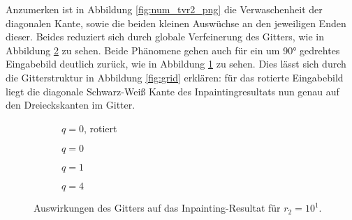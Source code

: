 \documentclass{mythesis}
\begin{document}


Anzumerken ist in Abbildung \ref{fig:num_tvr2_png} die Verwaschenheit der diagonalen Kante, sowie die beiden kleinen Auswüchse an den jeweiligen Enden dieser.
Beides reduziert sich durch globale Verfeinerung des Gitters, wie in Abbildung \ref{fig:num_tvrefine_png} zu sehen.
Beide Phänomene gehen auch für ein um 90° gedrehtes Eingabebild deutlich zurück, wie in Abbildung \ref{fig:num_tvgrid} zu sehen.
Dies lässt sich durch die Gitterstruktur in Abbildung \ref{fig:grid} erklären: für das rotierte Eingabebild liegt die diagonale Schwarz-Weiß Kante des Inpaintingresultats nun genau auf den Dreieckskanten im Gitter.

\begin{figure}[ht]
    \centering
    \begin{subfigure}{0.2\textwidth}
	\centering
	\caption{$q=0$, rotiert}
	\label{fig:num_tvgrid}
    \end{subfigure}%
    \begin{subfigure}{0.2\textwidth}
	\centering
	\caption{$q=0$}
    \end{subfigure}%
    \begin{subfigure}{0.2\textwidth}
	\centering
	\caption{$q=1$}
    \end{subfigure}%
    \begin{subfigure}{0.2\textwidth}
	\centering
	\caption{$q=4$}
    \end{subfigure}%
    \caption{Auswirkungen des Gitters auf das Inpainting-Resultat für $r_2=10^1$.}
    \label{fig:num_tvrefine_png}
\end{figure}
\end{document}
